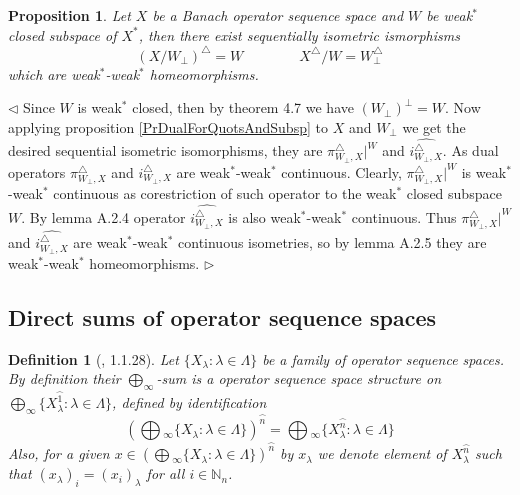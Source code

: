 \documentclass[12pt]{article}
\newtheorem{proposition}[theorem]{Proposition}
\newtheorem{definition}[theorem]{Definition}
\newenvironment{proof}{\par $\triangleleft$}{$\triangleright$}
\begin{document}
\begin{proposition}\label{PrDualForWStarClQuotsAndSubsp} Let $X$ be a Banach operator sequence space and $W$ be weak${}^*$ closed subspace of $X^*$, then there exist sequentially isometric ismorphisms
$$
(X/W_\perp)^\triangle= W \qquad\qquad X^\triangle/W=W_\perp^\triangle
$$
which are weak${}^*$-weak${}^*$ homeomorphisms.
\end{proposition}
\begin{proof} Since $W$ is weak${}^*$ closed, then by theorem 4.7 \cite{RudinFA} we have  $(W_\perp)^\perp=W$. Now applying proposition \ref{PrDualForQuotsAndSubsp} to $X$ and $W_\perp$ we get the desired sequential isometric isomorphisms, they are $\pi_{W_\perp,X}^\triangle|^W$ and $\widehat{i_{W_\perp,X}^\triangle}$. As dual operators $\pi_{W_\perp,X}^\triangle$ and $i_{W_\perp,X}^\triangle$ are weak${}^*$-weak${}^*$ continuous. Clearly, $\pi_{W_\perp,X}^\triangle|^W$ is weak${}^*$-weak${}^*$ continuous as corestriction of such operator to the weak${}^*$ closed subspace $W$. By lemma A.2.4 \cite{BleOpAlgAndMods} operator $\widehat{i_{W_\perp,X}^\triangle}$ is also weak${}^*$-weak${}^*$ continuous. Thus  $\pi_{W_\perp,X}^\triangle|^W$ and $\widehat{i_{W_\perp,X}^\triangle}$ are weak${}^*$-weak${}^*$ continuous isometries, so by lemma A.2.5 \cite{BleOpAlgAndMods} they are weak${}^*$-weak${}^*$ homeomorphisms.
\end{proof}

























\subsection{Direct sums of operator sequence spaces}

\begin{definition}[\cite{LamOpFolgen}, 1.1.28]\label{DefSQProd}
Let $\{X_\lambda: \lambda \in \Lambda\}$ be a family of operator sequence spaces. By definition their $\bigoplus_\infty$-sum is a operator sequence space structure on 
$\bigoplus_\infty\{X_\lambda^{\wideparen{1}}:\lambda\in \Lambda\}$, defined by identification
$$
\left(\bigoplus{}_\infty\{X_\lambda:\lambda \in \Lambda\}\right)^{\wideparen{n}}
=\bigoplus{}_\infty\{X_\lambda^{\wideparen{n}}:\lambda\in \Lambda\}
$$
Also, for a given $x\in \left(\bigoplus{}_\infty\{X_\lambda:\lambda \in \Lambda\}\right)^{\wideparen{n}}$ by $x_\lambda$ we denote element of $X_\lambda^{\wideparen{n}}$ such that $(x_\lambda)_i=(x_i)_\lambda$ for all $i\in\mathbb{N}_n$.
\end{definition}
\end{document}
